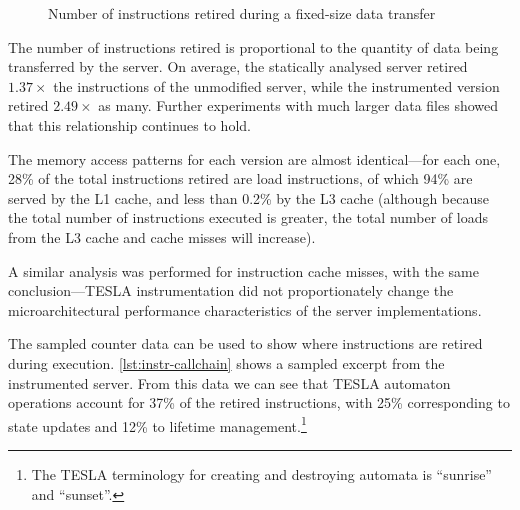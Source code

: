 \begin{figure}
  \centering
  \caption{Number of instructions retired during a fixed-size data
  transfer}
  \label{fig:retired-bench}
\end{figure}

The number of instructions retired is proportional to the quantity of data being
transferred by the server. On average, the statically analysed server retired
$1.37\times$ the instructions of the unmodified server, while the instrumented
version retired $2.49\times$ as many. Further experiments with much larger data
files showed that this relationship continues to hold.

The memory access patterns for each version are almost identical---for each one,
28\% of the total instructions retired are load instructions, of which 94\% are
served by the L1 cache, and less than 0.2\% by the L3 cache (although because
the total number of instructions executed is greater, the total number of loads
from the L3 cache and cache misses will increase).

A similar analysis was performed for instruction cache misses, with the same
conclusion---TESLA instrumentation did not proportionately change the
microarchitectural performance characteristics of the server implementations.

The sampled counter data can be used to show where instructions are
retired during execution. \autoref{lst:instr-callchain} shows a sampled
excerpt from the instrumented server. From this data we can see that
TESLA automaton operations account for 37\% of the retired instructions,
with 25\% corresponding to state updates and 12\% to lifetime
management.\footnote{The TESLA terminology for creating and destroying
automata is ``sunrise'' and ``sunset''.}

